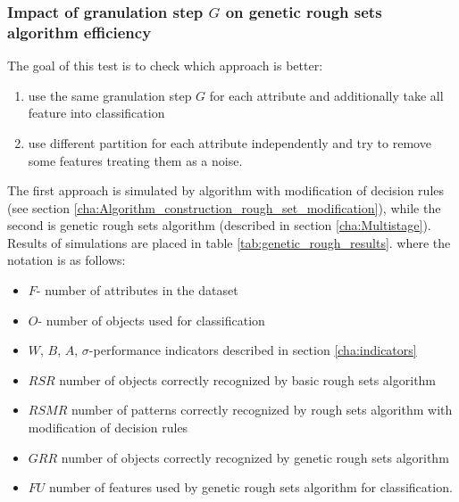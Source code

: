 \subsubsection{Impact of granulation step $G$ on genetic rough sets algorithm efficiency}
\label{cha:Simulation_reaearch_4}
The goal of this test is to check which approach is better:
\begin{enumerate}
    \item use the same granulation step $G$ for each attribute and additionally
        take all feature into classification
    \item use different partition for each attribute independently and try to
        remove some features treating them as a noise.
\end{enumerate}
The first approach is simulated by algorithm with modification of decision
rules (see section \ref{cha:Algorithm_construction_rough_set_modification}), 
while the second is genetic rough sets algorithm (described in section
\ref{cha:Multistage}). Results of simulations are placed in table \ref{tab:genetic_rough_results}.
where the notation is as follows:
\begin{itemize}
    \item $F$- number of attributes in the dataset
    \item $O$- number of objects used for classification
    \item $W$, $B$, $A$, $\sigma$-performance indicators described in section \ref{cha:indicators}
    \item $RSR$ number of objects correctly recognized by basic rough sets
        algorithm
    \item $RSMR$ number of patterns correctly recognized by rough sets
        algorithm with modification of decision rules
    \item $GRR$ number of objects correctly recognized by genetic rough sets
        algorithm
    \item $FU$ number of features used by genetic rough sets algorithm for
        classification.
\end{itemize}

